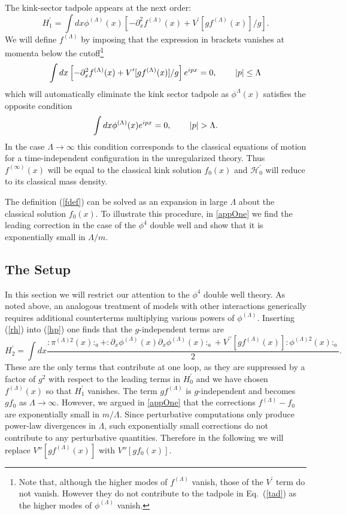 \def\letter{0}\def\pr{0}\documentclass[a4paper,12pt, epsfig]{article}
\makeatletter
\def\hsp{,\hspace{.7cm}}
\renewcommand{\(}{\begin{equation}}
\renewcommand{\)}{end{equation} \vspace{-.05in}\linebreak}
\renewcommand{\=}{\hspace{-.03in}=\hspace{-.02in}}
\renewcommand{\(}{\begin{equation}}
\renewcommand{\)}{\end{equation}}
\renewcommand{\hsp}{,\hspace{.3in}}
\newcommand{\p}{^\prime}
\newcommand{\pp}{^{\prime\prime}}
\renewcommand{\(}{\begin{equation}}
\renewcommand{\)}{\end{equation}}
\renewcommand{\L}{{(\Lambda)}}
\def\mh{\mathcal{H}}
\newcommand{\beq}{\begin{equation}}
\newcommand{\eeq}{\end{equation}}
\def\section{\@startsection{section}{1}{\z@}{3.5ex plus 1ex minus  .2ex}{2.3ex plus .2ex}{\large\bf}}
\makeatother
\begin{document}
The kink-sector tadpole appears at the next order:
\beq
H\p_1=\int dx \phi^\L(x)\left[-\partial^2_xf^{\L}(x)+V\p[gf^\L(x)]/g\right]. \label{tad}
\eeq
We will define $f^\L$ by imposing that the expression in brackets vanishes at momenta below the cutoff\footnote{Note that, although the higher modes of $f^{\L}$ vanish, those of the $V\p$ term do not vanish.  However they do not contribute to the tadpole in Eq.~(\ref{tad}) as the higher modes of $\phi^\L$ vanish.}
\beq
\int dx \left[-\partial^2_xf^{\L}(x)+V\p[gf^\L(x)]/g\right]e^{ipx}=0\hsp |p|\leq \Lambda \label{fdef}
\eeq
which will automatically eliminate the kink sector tadpole as $\phi^\Lambda(x)$ satisfies the opposite condition
\beq
\int dx \phi^\L(x) e^{ipx}=0\hsp |p|> \Lambda.
\eeq
In the case $\Lambda\rightarrow \infty$ this condition corresponds to the classical equations of motion for a time-independent configuration in the unregularized theory.  Thus $f^{(\infty)}(x)$ will be equal to the classical kink solution $f_0(x)$ and $\mh\p_0$ will reduce to its classical mass density.

The definition (\ref{fdef}) can be solved as an expansion in large $\Lambda$ about the classical solution $f_0(x)$.  To illustrate this procedure, in \ref{appOne} we find the leading correction in the case of the $\phi^4$ double well and show that it is exponentially small in $\Lambda/m$.

\section{The Kink Sector} \label{kinksez}

\subsection{The Setup}

In this section we will restrict our attention to the $\phi^4$ double well theory.  As noted above, an analogous treatment of models with other interactions generically requires additional counterterms multiplying various powers of $\phi^\L$.  Inserting (\ref{rh}) into (\ref{hp}) one finds that the $g$-independent terms are
\beq
H\p_2=\int dx \frac{:\pi^{\L 2}(x):_a+:\partial_x {\phi}^\L (x)\partial_x {\phi}^\L (x):_a+V\pp[g f^\L(x)]:\phi^{\L 2}(x):_a}{2}. \label{h2}
\eeq
These are the only terms that contribute at one loop, as they are suppressed by a factor of $g^2$ with respect to the leading terms in $H\p_0$ and we have chosen $f^\L(x)$ so that $H\p_1$ vanishes.  The term $g f^{(\Lambda)}$ is $g$-independent and becomes $g f_0$ as $\Lambda \to \infty$. However, we argued in \ref{appOne} that the corrections $f^\L-f_0$ are exponentially small in $m/\Lambda$.  Since perturbative computations only produce power-law divergences in $\Lambda$, such exponentially small corrections do not contribute to any perturbative quantities.  Therefore in the following we will replace $V''[g f^{(\Lambda)}(x)]$ with $V''[g f_0(x)]$.
\end{document}
